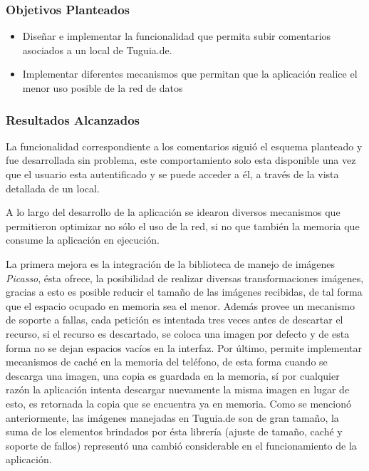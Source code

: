 \subsubsection{Objetivos Planteados} 

\begin{itemize}
\item Diseñar e implementar la funcionalidad que permita subir comentarios asociados a un local de Tuguia.de.
\item Implementar diferentes mecanismos que permitan que la aplicación realice el menor uso posible de la red de datos
\end{itemize}

\subsubsection{Resultados Alcanzados}

La funcionalidad correspondiente a los comentarios siguió el esquema planteado y fue desarrollada sin problema, este comportamiento solo esta disponible una vez que el usuario esta autentificado y se puede acceder a él, a través de la vista detallada de un local.

A lo largo del desarrollo de la aplicación se idearon diversos mecanismos que permitieron optimizar no sólo el uso de la red, si no que también la memoria que consume la aplicación en ejecución.

La primera mejora es la integración de la biblioteca de manejo de imágenes \textit{Picasso}, ésta ofrece, la posibilidad de realizar diversas transformaciones imágenes, gracias a esto es posible reducir el tamaño de las imágenes recibidas, de tal forma que el espacio ocupado en memoria sea el menor. Además provee un mecanismo de soporte a fallas, cada petición es intentada tres veces antes de descartar el recurso, si el recurso es descartado, se coloca una imagen por defecto y de esta forma no se dejan espacios vacíos en la interfaz. Por último, permite implementar mecanismos de caché en la memoria del teléfono, de esta forma cuando se descarga una imagen, una copia es guardada en la memoria, sí por cualquier razón la aplicación intenta descargar nuevamente la misma imagen en lugar de esto, es retornada la copia que se encuentra ya en memoria. Como se mencionó anteriormente, las imágenes manejadas en Tuguia.de son de gran tamaño, la suma de los elementos brindados por ésta librería (ajuste de tamaño, caché y soporte de fallos) representó una cambió considerable en el funcionamiento de la aplicación. 

